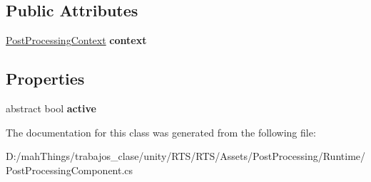 \subsection*{Public Attributes}
\begin{DoxyCompactItemize}
\item 
\mbox{\label{class_unity_engine_1_1_post_processing_1_1_post_processing_component_base_a2253833defff1ca009222538992a92fd}} 
\mbox{\hyperlink{class_unity_engine_1_1_post_processing_1_1_post_processing_context}{Post\+Processing\+Context}} {\bfseries context}
\end{DoxyCompactItemize}
\subsection*{Properties}
\begin{DoxyCompactItemize}
\item 
\mbox{\label{class_unity_engine_1_1_post_processing_1_1_post_processing_component_base_a2ede55be3b7f31c1628341f5d0fe7b77}} 
abstract bool {\bfseries active}
\end{DoxyCompactItemize}


The documentation for this class was generated from the following file\+:\begin{DoxyCompactItemize}
\item 
D\+:/mah\+Things/trabajos\+\_\+clase/unity/\+R\+T\+S/\+R\+T\+S/\+Assets/\+Post\+Processing/\+Runtime/Post\+Processing\+Component.\+cs\end{DoxyCompactItemize}
